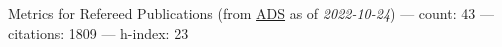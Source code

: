 Metrics for Refereed Publications (from \href{\adsurl}{ADS} as of \textit{2022-10-24}) --- count: 43 --- citations: 1809 --- h-index: 23